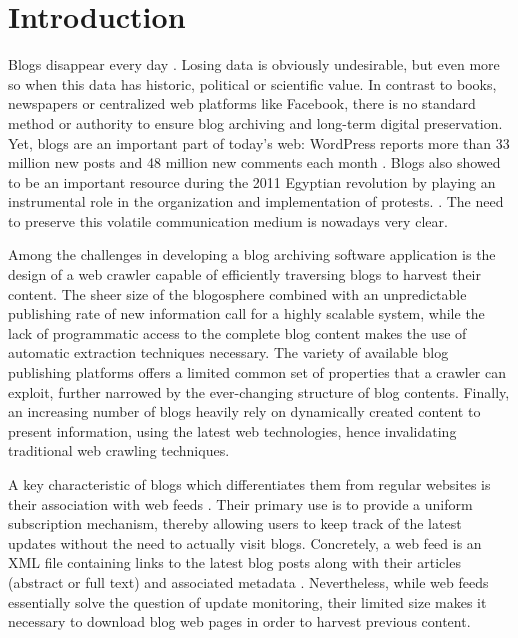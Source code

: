 \section{Introduction}

Blogs disappear every day \cite{johnson2008blogs}. Losing data is obviously undesirable, but even more so when this data has historic, political or scientific value. In contrast to books, newspapers or centralized web platforms like Facebook, there is no standard method or authority to ensure blog archiving and long-term digital preservation. Yet, blogs are an important part of today's web: WordPress reports more than 33 million new posts and 48 million new comments each month \cite{wordpress2014}. Blogs also showed to be an important resource during the 2011 Egyptian revolution by playing an instrumental role in the organization and implementation of protests. \cite{nahedeltantawy2012}. The need to preserve this volatile communication medium is nowadays very clear.

Among the challenges in developing a blog archiving software application is the design of a web crawler capable of efficiently traversing blogs to harvest their content. The sheer size of the blogosphere combined with an unpredictable publishing rate of new information call for a highly scalable system, while the lack of programmatic access to the complete blog content makes the use of automatic extraction techniques necessary. The variety of available blog publishing platforms offers a limited common set of properties that a crawler can exploit, further narrowed by the ever-changing structure of blog contents. Finally, an increasing number of blogs heavily rely on dynamically created content to present information, using the latest web technologies, hence invalidating traditional web crawling techniques.

A key characteristic of blogs which differentiates them from regular websites is their association with web feeds \cite{lindahl2003weblogs}. Their primary use is to provide a uniform subscription mechanism, thereby allowing users to keep track of the latest updates without the need to actually visit blogs. Concretely, a web feed is an XML file containing links to the latest blog posts along with their articles (abstract or full text) and associated metadata \cite{board2007rss}. Nevertheless, while web feeds essentially solve the question of update monitoring, their limited size makes it necessary to download blog web pages in order to harvest previous content.

